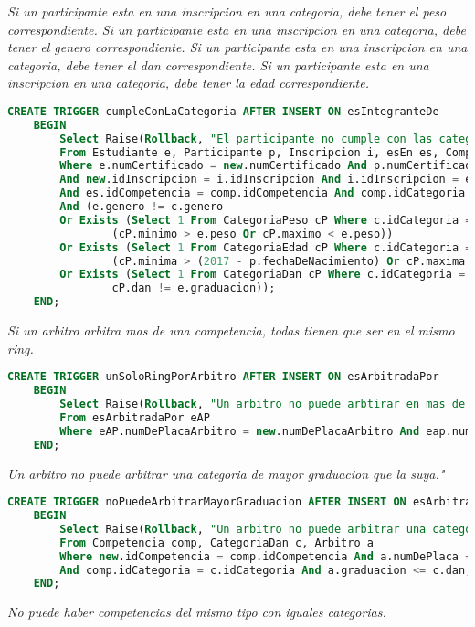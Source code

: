 \emph{
   Si un participante esta en una inscripcion en una categoria, debe tener el peso correspondiente.
   Si un participante esta en una inscripcion en una categoria, debe tener el genero correspondiente.
   Si un participante esta en una inscripcion en una categoria, debe tener el dan correspondiente.
   Si un participante esta en una inscripcion en una categoria, debe tener la edad correspondiente.
}

\begin{lstlisting}[language=SQL]
CREATE TRIGGER cumpleConLaCategoria AFTER INSERT ON esIntegranteDe
    BEGIN
        Select Raise(Rollback, "El participante no cumple con las categorias de la competencia.")
        From Estudiante e, Participante p, Inscripcion i, esEn es, Competencia comp, Categoria c
        Where e.numCertificado = new.numCertificado And p.numCertificado = new.numCertificado 
        And new.idInscripcion = i.idInscripcion And i.idInscripcion = es.idInscripcion 
        And es.idCompetencia = comp.idCompetencia And comp.idCategoria = c.idCategoria
        And (e.genero != c.genero
        Or Exists (Select 1 From CategoriaPeso cP Where c.idCategoria = cP.idCategoria And 
                (cP.minimo > e.peso Or cP.maximo < e.peso))
        Or Exists (Select 1 From CategoriaEdad cP Where c.idCategoria = cP.idCategoria And 
                (cP.minima > (2017 - p.fechaDeNacimiento) Or cP.maxima < (2017 - p.fechaDeNacimiento)))
        Or Exists (Select 1 From CategoriaDan cP Where c.idCategoria = cP.idCategoria And 
                cP.dan != e.graduacion));
    END;

\end{lstlisting}
\emph{
  Si un arbitro arbitra mas de una competencia, todas tienen que ser en el mismo ring.
}

\begin{lstlisting}[language=SQL]
CREATE TRIGGER unSoloRingPorArbitro AFTER INSERT ON esArbitradaPor
    BEGIN
        Select Raise(Rollback, "Un arbitro no puede arbtirar en mas de un ring.")
        From esArbitradaPor eAP 
        Where eAP.numDePlacaArbitro = new.numDePlacaArbitro And eap.numeroDeRing != new.numeroDeRing;
    END;

\end{lstlisting}
\emph{
  Un arbitro no puede arbitrar una categoria de mayor graduacion que la suya."
}

\begin{lstlisting}[language=SQL]
CREATE TRIGGER noPuedeArbitrarMayorGraduacion AFTER INSERT ON esArbitradaPor
    BEGIN
        Select Raise(Rollback, "Un arbitro no puede arbitrar una categoria de mayor graduacion que la suya.")
        From Competencia comp, CategoriaDan c, Arbitro a
        Where new.idCompetencia = comp.idCompetencia And a.numDePlaca = new.numDePlacaArbitro 
        And comp.idCategoria = c.idCategoria And a.graduacion <= c.dan;
    END;


\end{lstlisting}
\emph{
  No puede haber competencias del mismo tipo con iguales categorias.
}


